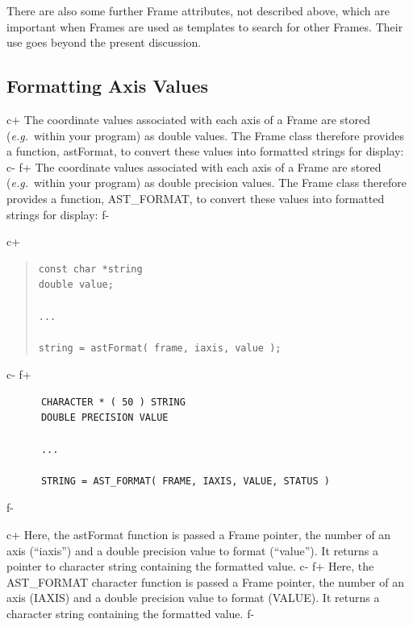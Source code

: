 \documentclass[twoside,11pt]{article}
\begin{document}
There are also some further Frame attributes, not described above,
which are important when Frames are used as templates to search for
other Frames. Their use goes beyond the present discussion.

\subsection{\label{ss:formattingaxisvalues}Formatting Axis Values}

c+
The coordinate values associated with each axis of a Frame are stored
({\em{e.g.}}\ within your program) as double values. The Frame class
therefore provides a function, astFormat, to convert these values into
formatted strings for display:
c-
f+
The coordinate values associated with each axis of a Frame are stored
({\em{e.g.}}\ within your program) as double precision values. The
Frame class therefore provides a function, AST\_FORMAT, to convert
these values into formatted strings for display:
f-

c+
\begin{quote}
\small
\begin{verbatim}
const char *string
double value;

...

string = astFormat( frame, iaxis, value );
\end{verbatim}
\normalsize
\end{quote}
c-
f+
\small
\begin{verbatim}
      CHARACTER * ( 50 ) STRING
      DOUBLE PRECISION VALUE

      ...

      STRING = AST_FORMAT( FRAME, IAXIS, VALUE, STATUS )
\end{verbatim}
\normalsize
f-

c+
Here, the astFormat function is passed a Frame pointer, the number of
an axis (``iaxis'') and a double precision value to format
(``value''). It returns a pointer to character string containing the
formatted value.
c-
f+
Here, the AST\_FORMAT character function is passed a Frame pointer,
the number of an axis (IAXIS) and a double precision value to format
(VALUE). It returns a character string containing the formatted value.
f-
\label{ss:formattingwithdigits}
\end{document}
